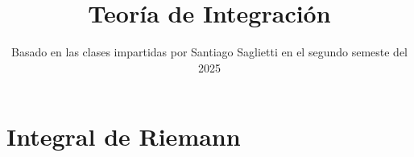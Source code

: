 \documentclass[a4paper]{report}
\title{Teoría de Integración}
\author{}
\date{Basado en las clases impartidas por Santiago Saglietti en el segundo semeste del 2025}
\begin{document}
    \maketitle
    \tableofcontents

    \chapter{Integral de Riemann}
    \setcounter{section}{0}

	
	
	
	
	
	
	
	
	
	
	
	
	
	
	
	
	
	
	
	
	
	
	
	
	
	
	
	
	
	
	
	
	
	
	
	
	
	
	
	
	
	
	
	
	

\end{document}
